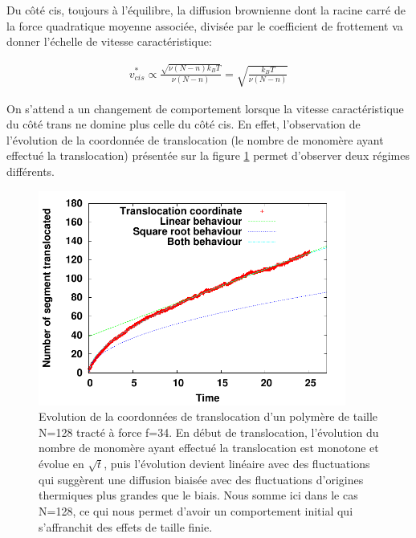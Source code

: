 Du côté cis, toujours à l'équilibre, la diffusion brownienne dont la racine carré de la force quadratique moyenne associée, divisée par le coefficient de frottement va donner l'échelle de vitesse caractéristique:

\begin{center}
\begin{eqnarray}
v^*_{cis} \propto \frac{\sqrt{\nu(N-n)k_BT}}{\nu(N-n)} = \sqrt{\frac{k_BT}{\nu(N-n)}}
\end{eqnarray}
\end{center}

On s'attend a un changement de comportement lorsque la vitesse caractéristique du côté trans ne domine plus celle du côté cis. En effet, l'observation de l'évolution de la coordonnée de translocation (le nombre de monomère ayant effectué la translocation) présentée sur la figure \ref{transloccoordinate} permet d'observer deux régimes différents.


\begin{figure}[H]
\begin{center}
\includegraphics[width=0.9\textwidth]{transloccoordinate.pdf}
\caption[Fluctuations de la coordonnée de translocation]{Evolution de la coordonnées de translocation d'un polymère de taille N=128 tracté à force f=34. En début de translocation, l'évolution du nombre de monomère ayant effectué la translocation est monotone et évolue en $\sqrt{t}$, puis l'évolution devient linéaire avec des fluctuations qui suggèrent une diffusion biaisée avec des fluctuations d'origines thermiques plus grandes que le biais. Nous somme ici dans le cas N=128, ce qui nous permet d'avoir un comportement initial  qui s’affranchit des effets de taille finie.}
\label{transloccoordinate}
\end{center}
\end{figure}

